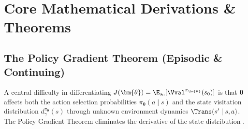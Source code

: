 \documentclass[../../../../master.tex]{subfiles}
\begin{document}
\section{Core Mathematical Derivations \& Theorems}\label{sec:pg:derivations}

\subsection{The Policy Gradient Theorem (Episodic \& Continuing)}

A central difficulty in differentiating $J(\bm{\theta}) = \E_{s_0}[\Vval^{\pi_{\bm{\theta}}}(s_0)]$ is that $\bm{\theta}$ affects both the action selection probabilities $\pi_{\bm{\theta}}(a \mid s)$ and the state visitation distribution $d^{\pi_{\bm{\theta}}}_\gamma(s)$ through unknown environment dynamics $\Trans(s' \mid s, a)$. The Policy Gradient Theorem eliminates the derivative of the state distribution .
\end{document}
